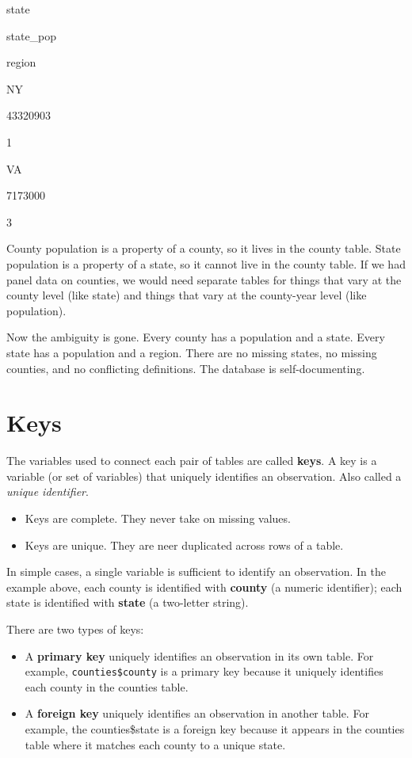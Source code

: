 \documentclass[]{book}
\providecommand{\tightlist}{%
  \setlength{\itemsep}{0pt}\setlength{\parskip}{0pt}}
\begin{document}
state

state\_pop

region

NY

43320903

1

VA

7173000

3

County population is a property of a county, so it lives in the county table. State population is a property of a state, so it cannot live in the county table. If we had panel data on counties, we would need separate tables for things that vary at the county level (like state) and things that vary at the county-year level (like population).

Now the ambiguity is gone. Every county has a population and a state. Every state has a population and a region. There are no missing states, no missing counties, and no conflicting definitions. The database is self-documenting.

\hypertarget{keys}{%
\section{Keys}\label{keys}}

The variables used to connect each pair of tables are called \textbf{keys}. A key is a variable (or set of variables) that uniquely identifies an observation. Also called a \emph{unique identifier}.

\begin{itemize}
\tightlist
\item
  Keys are complete. They never take on missing values.
\item
  Keys are unique. They are neer duplicated across rows of a table.
\end{itemize}

In simple cases, a single variable is sufficient to identify an observation. In the example above, each county is identified with \textbf{county} (a numeric identifier); each state is identified with \textbf{state} (a two-letter string).

There are two types of keys:

\begin{itemize}
\item
  A \textbf{primary key} uniquely identifies an observation in its own table. For example, \texttt{counties\$county} is a primary key because it uniquely identifies each county in the counties table.
\item
  A \textbf{foreign key} uniquely identifies an observation in another table. For example, the counties\$state is a foreign key because it appears in the counties table where it matches each county to a unique state.
\end{itemize}
\end{document}
